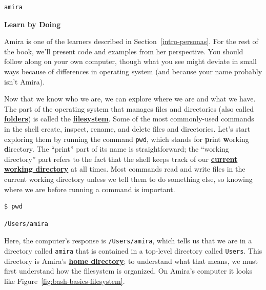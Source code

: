 \documentclass[
]{krantz}
\renewenvironment{quote}{\begin{VF}}{\end{VF}}
\newcommand{\gref}[2]{\hyperlink{#2}{\textbf{#1}}}
\begin{document}
\begin{verbatim}
amira
\end{verbatim}

\begin{quote}
\textbf{Learn by Doing}

Amira is one of the learners described in Section~\ref{intro-personas}.
For the rest of the book,
we'll present code and examples from her perspective.
You should follow along on your own computer,
though what you see might deviate in small ways because of differences in operating system
(and because your name probably isn't Amira).
\end{quote}

Now that we know who we are,
we can explore where we are and what we have.
The part of the operating system that manages files and directories (also called \gref{folders}{folder})
is called the \gref{filesystem}{filesystem}.
Some of the most commonly-used commands in the shell create, inspect, rename, and delete files and directories.
Let's start exploring them by running the command \texttt{pwd},
which stands for \textbf{p}rint \textbf{w}orking \textbf{d}irectory.
The ``print'' part of its name is straightforward;
the ``working directory'' part refers to the fact that
the shell keeps track of our \gref{current working directory}{current\_working\_directory} at all times.
Most commands read and write files in the current working directory
unless we tell them to do something else,
so knowing where we are before running a command is important.

\begin{verbatim}
$ pwd
\end{verbatim}

\begin{verbatim}
/Users/amira
\end{verbatim}

Here,
the computer's response is \texttt{/Users/amira},
which tells us that we are in a directory called \texttt{amira}
that is contained in a top-level directory called \texttt{Users}.
This directory is Amira's \gref{home directory}{home\_directory};
to understand what that means,
we must first understand how the filesystem is organized.
On Amira's computer
it looks like Figure~\ref{fig:bash-basics-filesystem}.
\end{document}
